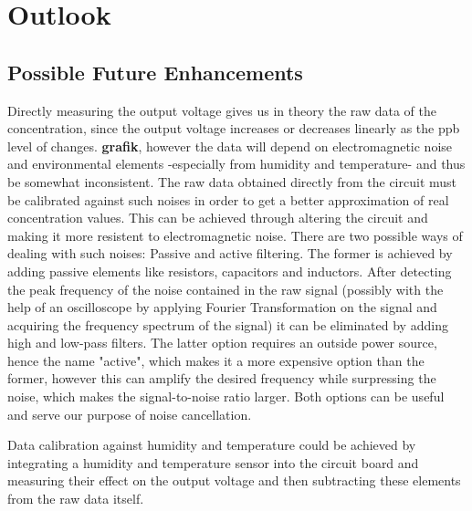 \chapter{Outlook}
\label{sec:outlook}

\section{Possible Future Enhancements}
Directly measuring the output voltage gives us in theory the raw data of the  concentration, since the output voltage increases or decreases linearly as the ppb level of  changes. \textbf{grafik}, however the data will depend on electromagnetic noise and environmental elements -especially from humidity and temperature- and thus be somewhat inconsistent. The raw data obtained directly from the circuit must be calibrated against such noises in order to get a better approximation of real concentration values. This can be achieved through altering the circuit and making it more resistent to electromagnetic noise. There are two possible ways of dealing with such noises: Passive and active filtering. The former is achieved by adding passive elements like resistors, capacitors and inductors. After detecting the peak frequency of the noise contained in the raw signal (possibly with the help of an oscilloscope by applying Fourier Transformation on the signal and acquiring the frequency spectrum of the signal) it can be eliminated by adding high and low-pass filters. The latter option requires an outside power source, hence the name "active", which makes it a more expensive option than the former, however this can amplify the desired frequency while surpressing the noise, which makes the signal-to-noise ratio larger. Both options can be useful and serve our purpose of noise cancellation.\par 
Data calibration against humidity and temperature could be achieved by integrating a humidity and temperature sensor into the circuit board and measuring their effect on the output voltage and then subtracting these elements from the raw data itself.


